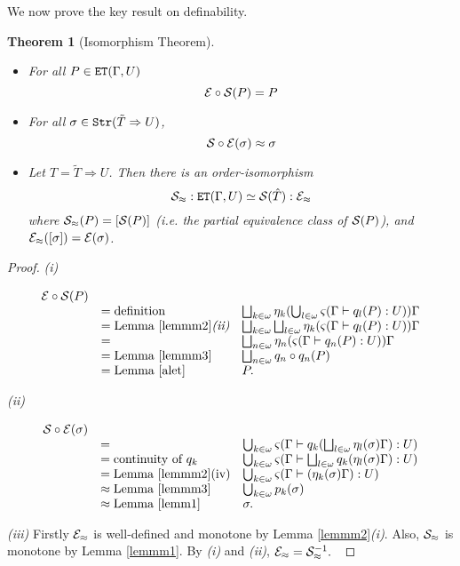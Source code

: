 \documentclass[11pt]{article}
\newtheorem{theorem}{Theorem}[section]
\begin{document}
We now prove the key result on definability.
\begin{theorem}[Isomorphism Theorem]\label{isotheo}

\begin{itemize}
\item[(i)] For all $P\in{\tt ET}(\Gamma,U)$
$$ {\cal E}\circ{\cal S}(P)=P$$
\item[(ii)] For all $\sigma\in{\tt Str}(\tilde{T}\Rightarrow U)$,
$${\cal S}\circ {\cal E}(\sigma)\approx \sigma$$
\item[(iii)] Let $T=\tilde{T}\Rightarrow U$. Then there is an
  order-isomorphism
$${\cal S}_{\approx}:{\tt ET}(\Gamma,U)\simeq {\cal S}( \hat{T}):{\cal
  E}_{\approx}$$
where ${\cal S}_{\approx}(P)=[{\cal S}(P)]$ (i.e. the partial
equivalence class of ${\cal S}(P)$), and ${\cal E}_{\approx}([\sigma
])={\cal E}(\sigma)$.
\end{itemize}
\end{theorem}
\begin{proof}

{\it (i)}

\[ \begin{array}{lll}
{\cal E}\circ {\cal S} (P) && \\
 &= {\mbox{definition}}&
 \bigsqcup_{k\in\omega}\eta_k(\bigcup_{l\in\omega}\varsigma(\Gamma
 \vdash q_l(P):U))\Gamma \\
&= {\mbox{Lemma \ref{lemmm2}{\it (ii)}}}&
\bigsqcup_{k\in\omega}\bigsqcup_{l\in\omega}
\eta_k(\varsigma(\Gamma\vdash q_l(P):U))\Gamma \\
&=&\bigsqcup_{n\in\omega} \eta_n(\varsigma(\Gamma\vdash
q_n(P):U))\Gamma \\
&= {\mbox{Lemma \ref{lemmm3}}}& \bigsqcup_{n\in\omega} q_n\circ q_n(P)
\\
&= {\mbox{Lemma \ref{alet}}}& P.

\end{array} \]

{\it (ii)}

\[\begin{array}{lll}
{\cal S}\circ{\cal E} (\sigma) &&\\
 &=& \bigcup_{k\in\omega} \varsigma(\Gamma\vdash
 q_k(\bigsqcup_{l\in\omega}\eta_l(\sigma)\Gamma):U) \\
&= {\mbox{continuity of }q_k} &
\bigcup_{k\in\omega}\varsigma(\Gamma\vdash \bigsqcup_{l\in\omega}
q_k(\eta_l(\sigma)\Gamma): U) \\
&= {\mbox{Lemma \ref{lemmm2}(iv)}}& \bigcup_{k\in\omega}
\varsigma(\Gamma\vdash(\eta_k(\sigma)\Gamma):U) \\
&\approx {\mbox{Lemma \ref{lemmm3}}} & \bigcup_{k\in\omega} p_k(\sigma)\\
&\approx {\mbox{Lemma \ref{lemm1}}} & \sigma.
\end{array} \]

{\it (iii)} Firstly ${\cal E}_{\approx}$ is well-defined and monotone by
Lemma \ref{lemmm2}{\it (i)}. Also, ${\cal S}_{\approx}$ is monotone by
Lemma \ref{lemmm1}. By {\it (i)} and {\it (ii)}, ${\cal E}_{\approx}={\cal
  S}_{\approx}^{-1}. \;\;$
\end{proof}
\end{document}

